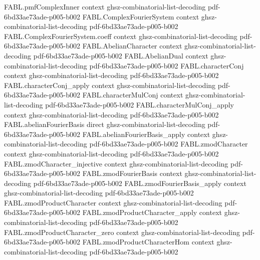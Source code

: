 \begin{theorem}
\label{FABL.ComplexFourierSystem.expansion}
\leanok
{}
\proofstep
  {FABL.pmfComplexInner}
  {context}
  {ghsz-combinatorial-list-decoding}
  {pdf-6bd33ae73ade-p005-b002}
\proofstep
  {FABL.ComplexFourierSystem}
  {context}
  {ghsz-combinatorial-list-decoding}
  {pdf-6bd33ae73ade-p005-b002}
\proofstep
  {FABL.ComplexFourierSystem.coeff}
  {context}
  {ghsz-combinatorial-list-decoding}
  {pdf-6bd33ae73ade-p005-b002}
\proofstep
  {FABL.AbelianCharacter}
  {context}
  {ghsz-combinatorial-list-decoding}
  {pdf-6bd33ae73ade-p005-b002}
\proofstep
  {FABL.AbelianDual}
  {context}
  {ghsz-combinatorial-list-decoding}
  {pdf-6bd33ae73ade-p005-b002}
\proofstep
  {FABL.characterConj}
  {context}
  {ghsz-combinatorial-list-decoding}
  {pdf-6bd33ae73ade-p005-b002}
\proofstep
  {FABL.characterConj_apply}
  {context}
  {ghsz-combinatorial-list-decoding}
  {pdf-6bd33ae73ade-p005-b002}
\proofstep
  {FABL.characterMulConj}
  {context}
  {ghsz-combinatorial-list-decoding}
  {pdf-6bd33ae73ade-p005-b002}
\proofstep
  {FABL.characterMulConj_apply}
  {context}
  {ghsz-combinatorial-list-decoding}
  {pdf-6bd33ae73ade-p005-b002}
\proofstep
  {FABL.abelianFourierBasis}
  {direct}
  {ghsz-combinatorial-list-decoding}
  {pdf-6bd33ae73ade-p005-b002}
\proofstep
  {FABL.abelianFourierBasis_apply}
  {context}
  {ghsz-combinatorial-list-decoding}
  {pdf-6bd33ae73ade-p005-b002}
\proofstep
  {FABL.zmodCharacter}
  {context}
  {ghsz-combinatorial-list-decoding}
  {pdf-6bd33ae73ade-p005-b002}
\proofstep
  {FABL.zmodCharacter_injective}
  {context}
  {ghsz-combinatorial-list-decoding}
  {pdf-6bd33ae73ade-p005-b002}
\proofstep
  {FABL.zmodFourierBasis}
  {context}
  {ghsz-combinatorial-list-decoding}
  {pdf-6bd33ae73ade-p005-b002}
\proofstep
  {FABL.zmodFourierBasis_apply}
  {context}
  {ghsz-combinatorial-list-decoding}
  {pdf-6bd33ae73ade-p005-b002}
\proofstep
  {FABL.zmodProductCharacter}
  {context}
  {ghsz-combinatorial-list-decoding}
  {pdf-6bd33ae73ade-p005-b002}
\proofstep
  {FABL.zmodProductCharacter_apply}
  {context}
  {ghsz-combinatorial-list-decoding}
  {pdf-6bd33ae73ade-p005-b002}
\proofstep
  {FABL.zmodProductCharacter_zero}
  {context}
  {ghsz-combinatorial-list-decoding}
  {pdf-6bd33ae73ade-p005-b002}
\proofstep
  {FABL.zmodProductCharacterHom}
  {context}
  {ghsz-combinatorial-list-decoding}
  {pdf-6bd33ae73ade-p005-b002}

\end{theorem}
